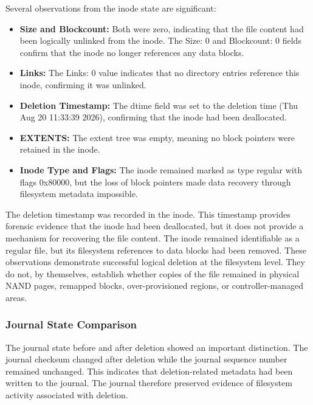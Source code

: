 Several observations from the inode state are significant:

\begin{itemize}
    \item \textbf{Size and Blockcount:} Both were zero, indicating that the file content had been logically unlinked from the inode. The Size: 0 and Blockcount: 0 
    fields confirm that the inode no longer references any data blocks.

    \item \textbf{Links:} The Links: 0 value indicates that no directory entries reference this inode, confirming it was unlinked.

    \item \textbf{Deletion Timestamp:} The dtime field was set to the deletion time (Thu Aug 20 11:33:39 2026), confirming that the inode had been deallocated.

    \item \textbf{EXTENTS:} The extent tree was empty, meaning no block pointers were retained in the inode.

    \item \textbf{Inode Type and Flags:} The inode remained marked as type regular with flags 0x80000, but the loss of block pointers made data recovery through 
    filesystem metadata impossible.
\end{itemize}
The deletion timestamp was recorded in the inode. This timestamp provides forensic evidence that the inode had been deallocated, but it does not provide a mechanism for recovering the file content. The inode remained identifiable as a regular file, but its filesystem references to data blocks had been removed. These observations demonstrate successful logical deletion at the filesystem level. They do not, by themselves, establish whether copies of the file remained in physical NAND pages, remapped blocks, over-provisioned regions, or controller-managed areas.
\subsubsection*{Journal State Comparison}

The journal state before and after deletion showed an important distinction. The journal checksum changed after deletion while the journal sequence number remained unchanged. This indicates that deletion-related metadata had been written to the journal. The journal therefore preserved evidence of filesystem activity associated with deletion.

